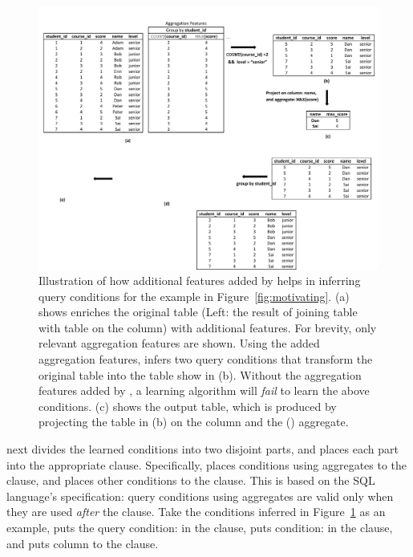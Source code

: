 \begin{figure}[t]
  \centering
  \includegraphics[scale=0.65]{fullexample}
  \vspace*{-5.0ex}\caption {{\label{fig:fullexample}
  Illustration of how additional features added by \ourtool
  helps in inferring query conditions for the example in Figure~\ref{fig:motivating}.
  (a) shows \ourtool
  enriches the original table (Left: the
  result of joining table  with table
   on the  column)
  with additional features. For brevity, only relevant
  aggregation features are shown. Using the added aggregation
  features, \ourtool infers two query conditions that
  transform the original table into the table show in (b).
  Without the aggregation features added by
  \ourtool, a learning algorithm will \textit{fail} to learn the above conditions.
  (c) shows the output table, which is produced by projecting the
   table in (b)
  on the  column and the () aggregate.}}

\end{figure}


\ourtool next divides the learned conditions into two disjoint parts,
and places each part into the appropriate clause.
Specifically, \ourtool places conditions
using aggregates to the 
clause, and places other conditions to the  clause.
This is based on the SQL language's specification:
query conditions using aggregates are valid only when they
are used \textit{after} the  clause.
Take the conditions inferred in Figure~\ref{fig:fullexample}
as an example, \ourtool puts the query
condition: 
in the  clause,
puts condition: 
in the  clause, and puts
column  to the  clause.




